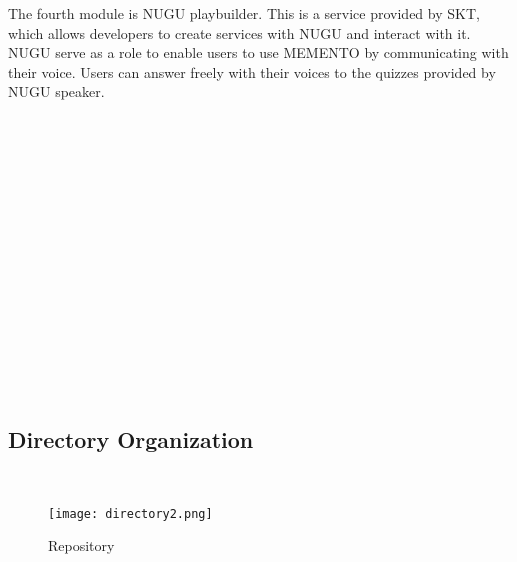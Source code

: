 \documentclass[conference]{IEEEtran}
\begin{document}
\indent The fourth module is NUGU playbuilder. This is a service provided by SKT, which allows developers to create services with NUGU and interact with it. NUGU serve as a role to enable users to use MEMENTO by communicating with their voice. Users can answer freely with their voices to the quizzes provided by NUGU speaker. \\
\\\\\\\\\\\\\\\\\\\\\\\\\\\\\\
\subsection{Directory Organization}
\\
\begin{figure}[h]
\centerline{\texttt{[image: directory2.png]}}
\caption{Repository}
\label{fig}
\end{figure}
\end{document}
